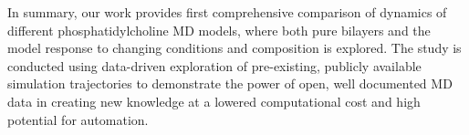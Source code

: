 \documentclass[journal=jpcbfk,manuscript=article,layout=twocolumn]{achemso}
\begin{document}

In summary, our work provides first comprehensive comparison of dynamics of different phosphatidylcholine MD models, where both pure bilayers and the model response to changing conditions and composition is explored. The study is conducted using data-driven exploration of pre-existing, publicly available simulation trajectories to demonstrate the power of open, well documented MD data in creating new knowledge at a lowered computational cost and high potential for automation.  
\end{document}
